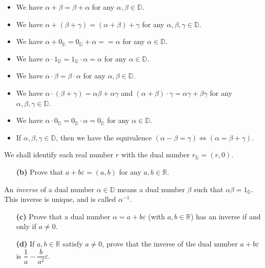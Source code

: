 \documentclass[paper=a4, fontsize=12pt]{scrartcl} %
\newcommand{\RR}{\mathbb{R}} %
\newcommand{\DD}{{\mathbb{D}}} %
\newcommand{\tup}[1]{\left( #1 \right)}
\newcommand{\eps}{\varepsilon}
\theoremstyle{plainsl}
\theoremstyle{definition}
\theoremstyle{remark}
\begin{document}
\begin{itemize}

\item We have $\alpha + \beta = \beta + \alpha$
for any $\alpha, \beta \in \DD$.

\item We have $\alpha + \tup{\beta + \gamma}
= \tup{\alpha + \beta} + \gamma$
for any $\alpha, \beta, \gamma \in \DD$.

\item We have
$\alpha + 0_\DD = 0_\DD + \alpha = = \alpha$
for any $\alpha \in \DD$.

\item We have
$\alpha \cdot 1_\DD = 1_\DD \cdot \alpha = \alpha$
for any $\alpha \in \DD$.

\item We have $\alpha \cdot \beta = \beta \cdot \alpha$
for any $\alpha, \beta \in \DD$.

\item We have $\alpha \cdot \tup{\beta + \gamma}
= \alpha \beta + \alpha \gamma$
and $\tup{\alpha + \beta} \cdot \gamma
= \alpha \gamma + \beta \gamma$
for any $\alpha, \beta, \gamma \in \DD$.

\item We have
$\alpha \cdot 0_\DD = 0_\DD \cdot \alpha = 0_\DD$
for any $\alpha \in \DD$.

\item If $\alpha, \beta, \gamma \in \DD$,
then we have the equivalence
$\tup{\alpha - \beta = \gamma}
\iff \tup{\alpha = \beta + \gamma}$.
\end{itemize}

We shall identify each real number $r$ with the dual
number $r_\DD = \tup{r, 0}$.

\begin{enumerate}

\item[\textbf{(b)}]
Prove that $a + b\eps = \tup{a, b}$
for any $a, b \in \RR$.

\end{enumerate}

An \textit{inverse} of a dual number
$\alpha \in \DD$ means a dual number $\beta$ such
that $\alpha \beta = 1_\DD$.
This inverse is unique, and is called $\alpha^{-1}$.

\begin{enumerate}

\item[\textbf{(c)}]
Prove that a dual number $\alpha = a + b\eps$
(with $a, b \in \RR$) has an inverse if and only
if $a \neq 0$.

\item[\textbf{(d)}]
If $a, b \in \RR$ satisfy $a \neq 0$, prove
that the inverse of the dual number $a + b\eps$
is $\dfrac{1}{a} - \dfrac{b}{a^2} \eps$.

\end{enumerate}
\end{document}
